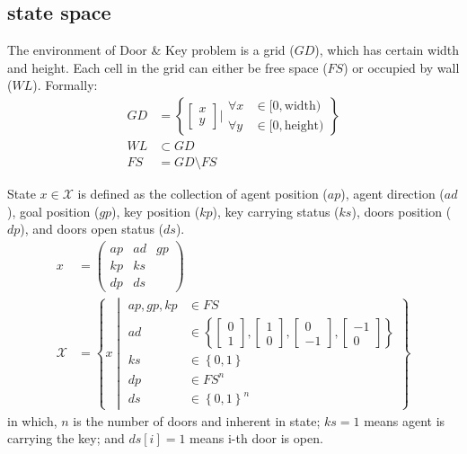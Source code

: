 \documentclass[conference]{IEEEtran}
\begin{document}
\subsection{state space}
The environment of Door \& Key problem is a grid ($GD$),
which has certain width and height. 
Each cell in the grid can either be free space ($FS$) or occupied by wall ($WL$).
Formally:
$$
\begin{aligned}
GD
&= \left\{ 
    \left[ \begin{gathered} x \\ y \end{gathered} \right] 
    \bigg|
    \begin{aligned}
    \forall x &\in [0, \text{width}) \\
    \forall y &\in [0, \text{height})
    \end{aligned} 
\right\} \\
WL &\subset GD \\
FS & = GD\setminus FS
\end{aligned}
$$ 

State $x \in \mathcal{X}$ is defined as the collection of 
agent position ($ap$), agent direction ($ad$), goal position ($gp$),
key position ($kp$), key carrying status ($ks$), 
doors position ($dp$), and doors open status ($ds$).
$$
\begin{aligned}
x
&=\left( \begin{matrix}
    ap & ad & gp \\ 
    kp & ks &\\ 
    dp & ds
&\end{matrix} \right) \\
\mathcal{X}
    &=\left\{ x\middle|\begin{aligned}
        ap,gp,kp&\in FS\\ 
        ad&\in \left\{ \left[ \begin{gathered}0\\ 1\end{gathered} \right]  ,\left[ \begin{gathered}1\\ 0\end{gathered} \right]  ,\left[ \begin{gathered}0\\ -1\end{gathered} \right]  ,\left[ \begin{gathered}-1\\ 0\end{gathered} \right]  \right\}  \\ 
        ks&\in \left\{ 0,1\right\}  \\ 
        dp&\in FS^{n}\\ 
        ds&\in \left\{ 0,1\right\}^{n}  
    \end{aligned} \right\}  
\end{aligned}
$$
in which, $n$ is the number of doors and inherent in state;
$ks = 1$ means agent is carrying the key; and $ds[i] = 1$ means i-th door is open.
\end{document}
